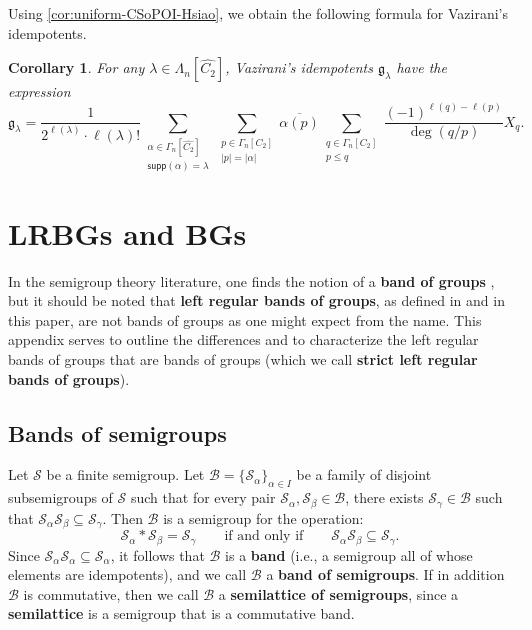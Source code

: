 \documentclass[11pt, oneside, reqno]{amsart}
\newtheorem{cor}[theorem]{Corollary}
\theoremstyle{definition}
\numberwithin{equation}{section}
\newcommand{\defn}[1]{{\color{RoyalBlue}\bf#1}}
\def \BB{{\mathcal{B}}}
\def \SS{{\mathcal{S}}}
\def \frakg{{\mathfrak{g}}}
\def \ol{\overline}
\def \wh{\widehat}
\def \ztwo {{C_2}}
\def\qqiff{\qquad\text{if and only if}\qquad}
\def \supp{\mathsf{supp}}
\newcommand{\abs}[1]{|{#1}|} 				%
\begin{document}
Using \cref{cor:uniform-CSoPOI-Hsiao}, we obtain the following formula for Vazirani's idempotents.

\begin{cor}\label{cor:vazclosedformexpression}
For any $\lambda \in \Lambda_n[\wh{\ztwo}]$, Vazirani's idempotents $\frakg_{\lambda}$ have the expression 
  \[  \frakg_{\lambda} = \dfrac{1}{2^{\ell(\lambda)} \cdot \ell(\lambda)!} \sum_{\substack{ \alpha \in \Gamma_n[\wh{\ztwo}] \\ \supp(\alpha) = \lambda}} \sum_{\substack{p \in \Gamma_n[\ztwo] \\ \abs{p} = \abs{\alpha} }} \ol{\alpha(p)} \sum_{\substack{q \in \Gamma_n[\ztwo] \\ p \leq q }} \dfrac{(-1)^{\ell(q)-\ell(p)}}{\deg(q/p)} X_q. \]
\end{cor}





\newpage

\appendix

\section{LRBGs and BGs}\label{s:appendix}

In the semigroup theory literature, one finds the notion of a \defn{band of
groups} \cite{clifford, cp61semigroupsI},
but it should be noted that \defn{left regular bands of groups},
as defined in \cite{ms11HomologySemigroups} and in this paper,
are not bands of groups as one might expect from the name.
This appendix serves to outline the differences and to characterize the left
regular bands of groups that are bands of groups
(which we call \defn{strict left regular bands of groups}).

\subsection{Bands of semigroups}
\label{bands-of-semigroups}

Let $\SS$ be a finite semigroup.
Let $\BB = \{\SS_\alpha\}_{\alpha \in I}$
be a family of disjoint subsemigroups of $\SS$
such that for every pair $\SS_\alpha, \SS_\beta \in \BB$,
there exists $\SS_\gamma \in \BB$
such that $\SS_\alpha \SS_\beta \subseteq \SS_{\gamma}$.
Then $\BB$ is a semigroup for the operation:
\begin{equation*}
    \SS_\alpha \ast \SS_\beta = \SS_\gamma
    \qqiff
    \SS_\alpha \SS_\beta \subseteq \SS_\gamma.
\end{equation*}
Since $\SS_\alpha \SS_\alpha \subseteq \SS_\alpha$, it follows that $\BB$
is a \defn{band} (i.e., a semigroup all of whose elements are idempotents),
and we call $\BB$ a \defn{band of semigroups}.
If in addition $\BB$ is commutative, then we call $\BB$
a \defn{semilattice of semigroups}, since a \defn{semilattice} is a semigroup
that is a commutative band.
\end{document}
